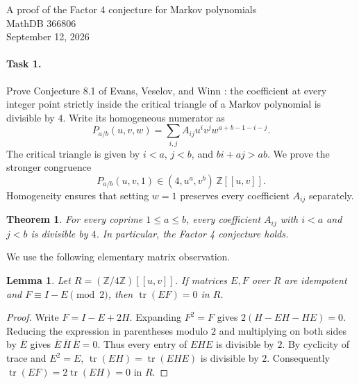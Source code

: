 \documentclass[11pt]{article}
\newtheorem{theorem}{Theorem}
\newtheorem{lemma}{Lemma}
\newcommand{\tr}{\operatorname{tr}}
\begin{document}
\begin{center}
{\Large A proof of the Factor 4 conjecture for Markov polynomials}\\[0.5em]
MathDB 366806\\
September 12, 2026
\end{center}

\paragraph{Task 1.}
Prove Conjecture 8.1 of Evans, Veselov, and Winn \cite{EVW}:
the coefficient at every integer point strictly inside the critical
triangle of a Markov polynomial is divisible by $4$.
Write its homogeneous numerator as
\[
 P_{a/b}(u,v,w)=
 \sum_{i,j} A_{ij}u^iv^jw^{a+b-1-i-j}.
\]
The critical triangle is given by $i<a$, $j<b$, and $bi+aj>ab$.
We prove the stronger congruence
\[
 P_{a/b}(u,v,1)\in (4,u^a,v^b)\,\mathbb Z[[u,v]].
 \tag{1}
\]
Homogeneity ensures that setting $w=1$ preserves every coefficient
$A_{ij}$ separately.

\begin{theorem}
For every coprime $1\leq a\leq b$, every coefficient $A_{ij}$ with
$i<a$ and $j<b$ is divisible by $4$. In particular, the Factor 4
conjecture holds.
\end{theorem}

We use the following elementary matrix observation.

\begin{lemma}\label{overlap}
Let $R=(\mathbb Z/4\mathbb Z)[[u,v]]$.
If matrices $E,F$ over $R$ are idempotent and
$F\equiv I-E\pmod2$, then $\tr(EF)=0$ in $R$.
\end{lemma}
\begin{proof}
Write $F=I-E+2H$. Expanding $F^2=F$ gives
$2(H-EH-HE)=0$.
Reducing the expression in parentheses modulo $2$ and multiplying
on both sides by $\overline E$ gives
$\overline E\,\overline H\,\overline E=0$.
Thus every entry of $EHE$ is divisible by $2$.
By cyclicity of trace and $E^2=E$,
$\tr(EH)=\tr(EHE)$ is divisible by $2$. Consequently
$\tr(EF)=2\tr(EH)=0$ in $R$.
\end{proof}
\end{document}
